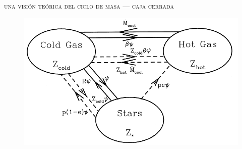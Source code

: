 \documentclass[xcolor=dvipsnames,4pt,hyperref={colorlinks,citecolor=black,linkcolor=black,urlcolor=black}]{beamer}
\begin{document}
\begin{frame}{\textsc{una visión teórica del ciclo de masa --- caja cerrada}}

\begin{figure}
\includegraphics[scale=1]{img/cole2000-3}
\end{figure}




\end{frame}
\end{document}

